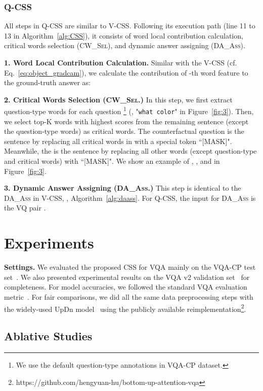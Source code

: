 \documentclass[10pt,twocolumn,letterpaper]{article}
\begin{document}
\subsubsection{Q-CSS}
All steps in Q-CSS are similar to V-CSS. Following its execution path (line 11 to 13 in Algorithm~\ref{alg:CSS}), it consists of word local contribution calculation, critical words selection (\textsc{CW\_Sel}), and dynamic answer assigning (\textsc{DA\_Ass}).

\textbf{1. Word Local Contribution Calculation.} Similar with the V-CSS (cf. Eq.~\eqref{eq:object_gradcam}), we calculate the contribution of -th word feature to the ground-truth answer  as:


\textbf{2. Critical Words Selection (\textsc{CW\_Sel}.)}  In this step, we first extract question-type words for each question \footnote{We use the default question-type annotations in VQA-CP dataset.} (\eg, "\texttt{what color}" in Figure~\ref{fig:3}). Then, we select top-K words with highest scores from the remaining sentence (except the question-type words) as critical words. The counterfactual question  is the sentence by replacing all critical words in  with a special token ``[MASK]". Meanwhile, the  is the sentence by replacing all other words (except question-type and critical words) with ``[MASK]". We show an example of , , and  in Figure~\ref{fig:3}.

\textbf{3. Dynamic Answer Assigning (\textsc{DA\_Ass}.)} This step is identical to the \textsc{DA\_Ass} in V-CSS, \ie, Algorithm~\ref{alg:daass}. For Q-CSS, the input for \textsc{DA\_Ass} is the VQ pair .

\section{Experiments}

\noindent\textbf{Settings.} We evaluated the proposed CSS for VQA mainly on the VQA-CP test set~\cite{agrawal2018don}. We also presented experimental results on the VQA v2 validation set~\cite{goyal2017making} for completeness. For model accuracies, we followed the standard  VQA evaluation metric~\cite{antol2015vqa}. For fair comparisons, we did all the same data preprocessing steps with the widely-used UpDn model~\cite{anderson2018bottom} using the publicly available reimplementation\footnote{https://github.com/hengyuan-hu/bottom-up-attention-vqa}. 


\subsection{Ablative Studies }
\end{document}
